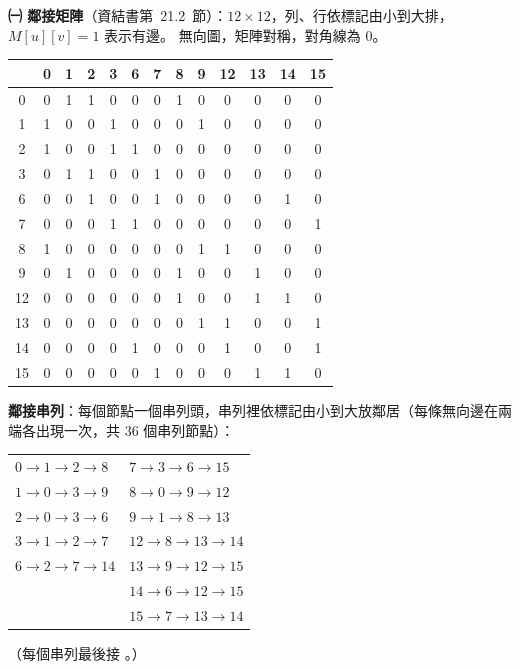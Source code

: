 \begin{pastsoln}
\textbf{㈠ 鄰接矩陣}（資結書第~21.2~節）：$12 \times 12$，列、行依標記由小到大排，$M[u][v] = 1$ 表示有邊。
無向圖，矩陣對稱，對角線為 $0$。
\begin{center}
\small
\setlength{\tabcolsep}{4pt}
\begin{tabular}{c|cccccccccccc}
 & 0 & 1 & 2 & 3 & 6 & 7 & 8 & 9 & 12 & 13 & 14 & 15 \\
\hline
0 & 0 & 1 & 1 & 0 & 0 & 0 & 1 & 0 & 0 & 0 & 0 & 0 \\
1 & 1 & 0 & 0 & 1 & 0 & 0 & 0 & 1 & 0 & 0 & 0 & 0 \\
2 & 1 & 0 & 0 & 1 & 1 & 0 & 0 & 0 & 0 & 0 & 0 & 0 \\
3 & 0 & 1 & 1 & 0 & 0 & 1 & 0 & 0 & 0 & 0 & 0 & 0 \\
6 & 0 & 0 & 1 & 0 & 0 & 1 & 0 & 0 & 0 & 0 & 1 & 0 \\
7 & 0 & 0 & 0 & 1 & 1 & 0 & 0 & 0 & 0 & 0 & 0 & 1 \\
8 & 1 & 0 & 0 & 0 & 0 & 0 & 0 & 1 & 1 & 0 & 0 & 0 \\
9 & 0 & 1 & 0 & 0 & 0 & 0 & 1 & 0 & 0 & 1 & 0 & 0 \\
12 & 0 & 0 & 0 & 0 & 0 & 0 & 1 & 0 & 0 & 1 & 1 & 0 \\
13 & 0 & 0 & 0 & 0 & 0 & 0 & 0 & 1 & 1 & 0 & 0 & 1 \\
14 & 0 & 0 & 0 & 0 & 1 & 0 & 0 & 0 & 1 & 0 & 0 & 1 \\
15 & 0 & 0 & 0 & 0 & 0 & 1 & 0 & 0 & 0 & 1 & 1 & 0 \\
\end{tabular}
\end{center}
\textbf{鄰接串列}：每個節點一個串列頭，串列裡依標記由小到大放鄰居（每條無向邊在兩端各出現一次，共 $36$ 個串列節點）：
\begin{center}
\small
\begin{tabular}{l@{\qquad}l}
$0 \to 1 \to 2 \to 8$ & $7 \to 3 \to 6 \to 15$ \\
$1 \to 0 \to 3 \to 9$ & $8 \to 0 \to 9 \to 12$ \\
$2 \to 0 \to 3 \to 6$ & $9 \to 1 \to 8 \to 13$ \\
$3 \to 1 \to 2 \to 7$ & $12 \to 8 \to 13 \to 14$ \\
$6 \to 2 \to 7 \to 14$ & $13 \to 9 \to 12 \to 15$ \\
 & $14 \to 6 \to 12 \to 15$ \\
 & $15 \to 7 \to 13 \to 14$ \\
\end{tabular}
\end{center}
（每個串列最後接 \NIL。）


\end{pastsoln}
